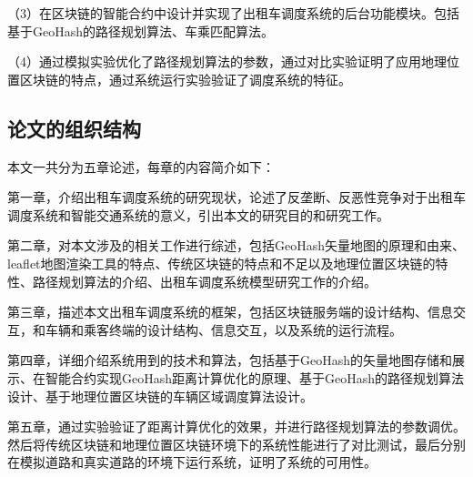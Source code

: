 （3）在区块链的智能合约中设计并实现了出租车调度系统的后台功能模块。包括基于GeoHash的路径规划算法、车乘匹配算法。

（4）通过模拟实验优化了路径规划算法的参数，通过对比实验证明了应用地理位置区块链的特点，通过系统运行实验验证了调度系统的特征。

\subsection{论文的组织结构}
本文一共分为五章论述，每章的内容简介如下：

第一章，介绍出租车调度系统的研究现状，论述了反垄断、反恶性竞争对于出租车调度系统和智能交通系统的意义，引出本文的研究目的和研究工作。

第二章，对本文涉及的相关工作进行综述，包括GeoHash矢量地图的原理和由来、leaflet地图渲染工具的特点、传统区块链的特点和不足以及地理位置区块链的特性、路径规划算法的介绍、出租车调度系统模型研究工作的介绍。

第三章，描述本文出租车调度系统的框架，包括区块链服务端的设计结构、信息交互，和车辆和乘客终端的设计结构、信息交互，以及系统的运行流程。

第四章，详细介绍系统用到的技术和算法，包括基于GeoHash的矢量地图存储和展示、在智能合约实现GeoHash距离计算优化的原理、基于GeoHash的路径规划算法设计、基于地理位置区块链的车辆区域调度算法设计。

第五章，通过实验验证了距离计算优化的效果，并进行路径规划算法的参数调优。然后将传统区块链和地理位置区块链环境下的系统性能进行了对比测试，最后分别在模拟道路和真实道路的环境下运行系统，证明了系统的可用性。